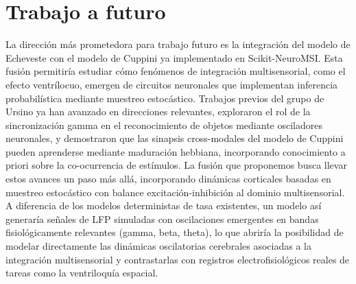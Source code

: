 \section{Trabajo a futuro}



La dirección más prometedora para trabajo futuro es la integración del modelo de Echeveste con el modelo de Cuppini ya implementado en Scikit-NeuroMSI. Esta fusión permitiría estudiar cómo fenómenos de integración multisensorial, como el efecto ventrílocuo, emergen de circuitos neuronales que implementan inferencia probabilística mediante muestreo estocástico. Trabajos previos del grupo de Ursino ya han avanzado en direcciones relevantes, \citet{ursino2009recognition} exploraron el rol de la sincronización gamma en el reconocimiento de objetos mediante osciladores neuronales, y \citet{ursino2017multisensory} demostraron que las sinapsis cross-modales del modelo de Cuppini pueden aprenderse mediante maduración hebbiana, incorporando conocimiento a priori sobre la co-ocurrencia de estímulos. La fusión que proponemos busca llevar estos avances un paso más allá, incorporando dinámicas corticales basadas en muestreo estocástico con balance excitación-inhibición al dominio multisensorial. A diferencia de los modelos deterministas de tasa existentes, un modelo así generaría señales de \acrshort{LFP} simuladas con oscilaciones emergentes en bandas fisiológicamente relevantes (gamma, beta, theta), lo que abriría la posibilidad de modelar directamente las dinámicas oscilatorias cerebrales asociadas a la integración multisensorial y contrastarlas con registros electrofisiológicos reales de tareas como la ventriloquía espacial.

